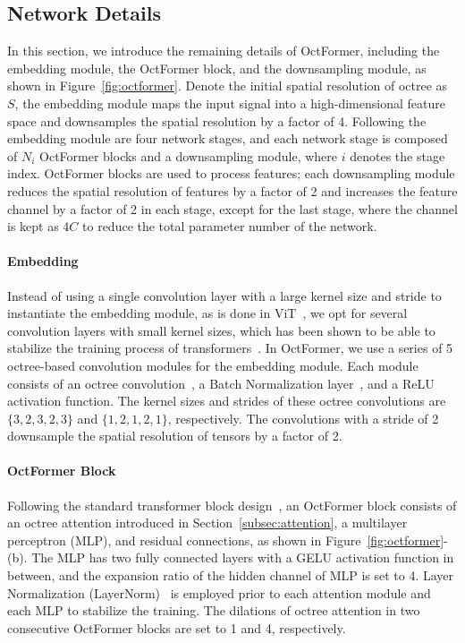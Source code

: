 \documentclass[acmtog,screen,authorversion]{acmart}
\begin{document}
\subsection{Network Details}  \label{subsec:network}
In this section, we introduce the remaining details of OctFormer, including the embedding module, the OctFormer block, and the downsampling module, as shown in Figure~\ref{fig:octformer}.
Denote the initial spatial resolution of octree as $S$, the embedding module maps the input signal into a high-dimensional feature space and downsamples the spatial resolution by a factor of 4.
Following the embedding module are four network stages, and each network stage is composed of $N_i$ OctFormer blocks and a downsampling module, where $i$ denotes the stage index.
OctFormer blocks are used to process features; each downsampling module reduces the spatial resolution of features by a factor of 2 and increases the feature channel by a factor of 2 in each stage, except for the last stage, where the channel is kept as $4C$ to reduce the total parameter number of the network.


\paragraph{Embedding}
Instead of using a single convolution layer with a large kernel size and stride to instantiate the embedding module, as is done in ViT~\cite{Dosovitskiy2021}, we opt for several convolution layers with small kernel sizes, which has been shown to be able to stabilize the training process of transformers~\cite{Xiao2021}.
In OctFormer, we use a series of 5 octree-based convolution modules for the embedding module.
Each module consists of an octree convolution~\cite{Wang2017}, a Batch Normalization layer~\cite{Loffe2015}, and a ReLU activation function.
The kernel sizes and strides of these octree convolutions are $\{3, 2, 3, 2, 3\}$ and $\{1, 2, 1, 2, 1\}$, respectively.
The convolutions with a stride of 2 downsample the spatial resolution of tensors by a factor of 2.


\paragraph{OctFormer Block}
Following the standard transformer block design~\cite{Vaswani2017}, an OctFormer block consists of an octree attention introduced in Section~\ref{subsec:attention}, a multilayer perceptron (MLP), and residual connections, as shown in Figure~\ref{fig:octformer}-(b).
The MLP has two fully connected layers with a GELU activation function in between, and the expansion ratio of the hidden channel of MLP is set to 4.
Layer Normalization (LayerNorm)~\cite{Ba2016} is employed prior to each attention module and each MLP to stabilize the training.
The dilations of octree attention in two consecutive OctFormer blocks are set to 1 and 4, respectively.
\end{document}
